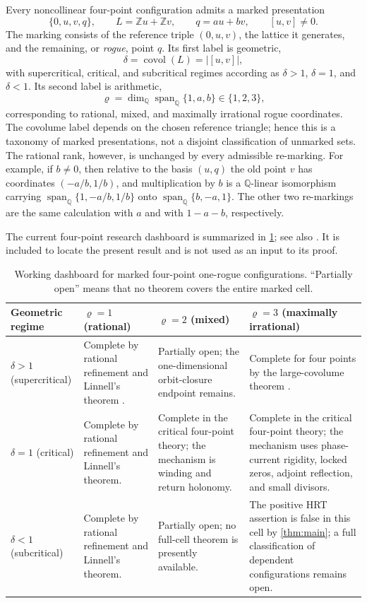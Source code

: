 \documentclass[11pt,reqno]{amsart}
\numberwithin{equation}{section}
\theoremstyle{definition}
\newcommand{\Q}{\mathbb Q}
\newcommand{\Z}{\mathbb Z}
\begin{document}
Every noncollinear four-point configuration admits a marked presentation
\begin{equation}\label{eq:marked-one-rogue}
 \{0,u,v,q\},\qquad
 L=\Z u+\Z v,\qquad q=a u+b v,\qquad [u,v]\ne0.
\end{equation}
The marking consists of the reference triple $(0,u,v)$, the lattice it
generates, and the remaining, or \emph{rogue}, point $q$.  Its first label is
geometric,
\[
 \delta=\operatorname{covol}(L)=|[u,v]|,
\]
with supercritical, critical, and subcritical regimes according as
$\delta>1$, $\delta=1$, and $\delta<1$.  Its second label is arithmetic,
\[
 \varrho=\dim_{\Q}\operatorname{span}_{\Q}\{1,a,b\}\in\{1,2,3\},
\]
corresponding to rational, mixed, and maximally irrational rogue coordinates.
The covolume label depends on the chosen reference triangle; hence this is a
taxonomy of marked presentations, not a disjoint classification of unmarked
sets.  The rational rank, however, is unchanged by every admissible
re-marking.  For example, if $b\ne0$, then relative to the basis $(u,q)$ the
old point $v$ has coordinates $(-a/b,1/b)$, and multiplication by $b$ is a
$\Q$-linear isomorphism carrying
$\operatorname{span}_{\Q}\{1,-a/b,1/b\}$ onto
$\operatorname{span}_{\Q}\{b,-a,1\}$.  The other two re-markings are the
same calculation with $a$ and with $1-a-b$, respectively.

The current four-point research dashboard is summarized in
\cref{tab:dashboard}; see also \cite{OussaBook2026}.  It is included to locate
the present result and is not used as an input to its proof.
\begin{table}[H]
\caption{Working dashboard for marked four-point one-rogue configurations.
``Partially open'' means that no theorem covers the entire marked cell.}
\label{tab:dashboard}
\small
\begin{tabularx}{\textwidth}{@{}>{\raggedright\arraybackslash}p{}
  >{\raggedright\arraybackslash}X
  >{\raggedright\arraybackslash}X
  >{\raggedright\arraybackslash}X@{}}
\toprule
Geometric regime & $\varrho=1$ (rational) &
$\varrho=2$ (mixed) & $\varrho=3$ (maximally irrational)\\
\midrule
$\delta>1$ (supercritical) &
Complete by rational refinement and Linnell's theorem \cite{Linnell}. &
Partially open; the one-dimensional orbit-closure endpoint remains. &
Complete for four points by the large-covolume theorem \cite{Oussa2026}.\\
\addlinespace
$\delta=1$ (critical) &
Complete by rational refinement and Linnell's theorem. &
Complete in the critical four-point theory; the mechanism is winding and
return holonomy. &
Complete in the critical four-point theory; the mechanism uses phase-current
rigidity, locked zeros, adjoint reflection, and small divisors.\\
\addlinespace
$\delta<1$ (subcritical) &
Complete by rational refinement and Linnell's theorem. &
Partially open; no full-cell theorem is presently available. &
The positive HRT assertion is false in this cell by \cref{thm:main}; a full
classification of dependent configurations remains open.\\
\bottomrule
\end{tabularx}
\end{table}
\end{document}
